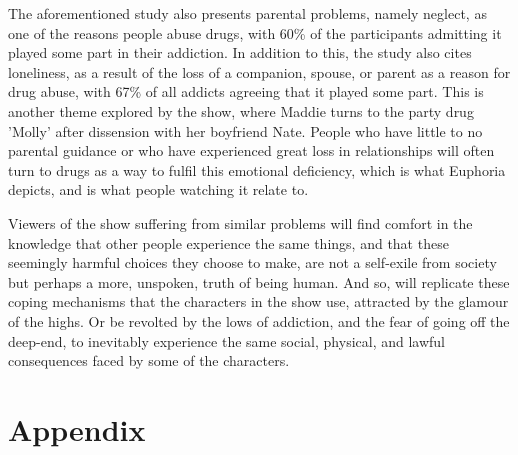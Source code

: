 \documentclass[runningheads]{llncs}
\begin{document}
The aforementioned study also presents parental problems, namely neglect, as one of the reasons people abuse drugs, with 60\% of the participants admitting it played some part in their addiction. In addition to this, the study also cites loneliness, as a result of the loss of a companion, spouse, or parent as a reason for drug abuse, with 67\% of all addicts agreeing that it played some part. This is another theme explored by the show, where Maddie turns to the party drug 'Molly' after dissension with her boyfriend Nate. People who have little to no parental guidance or who have experienced great loss in relationships will often turn to drugs as a way to fulfil this emotional deficiency, which is what Euphoria depicts, and is what people watching it relate to.

Viewers of the show suffering from similar problems will find comfort in the knowledge that other people experience the same things, and that these seemingly harmful choices they choose to make, are not a self-exile from society but perhaps a more, unspoken, truth of being human. And so, will replicate these coping mechanisms that the characters in the show use, attracted by the glamour of the highs. Or be revolted by the lows of addiction, and the fear of going off the deep-end, to inevitably experience the same social, physical, and lawful consequences faced by some of the characters.

\section{Appendix}
\end{document}
